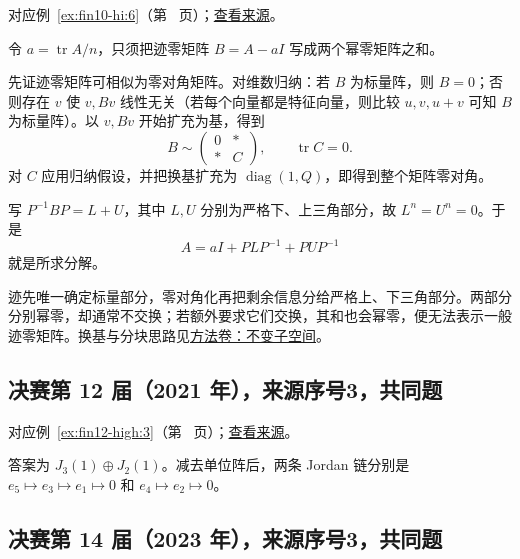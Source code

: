 \documentclass[12pt,fontset=fandol]{ctexart}
\begin{document}
对应例~\ref{ex:fin10-hi:6}（第~\pageref{ex:fin10-hi:6} 页）；\href{https://github.com/lzxcr/cmc-mathematics/blob/64916fa1fdbc3e444a652eca204d5669058ee321/src/problems/finals/10/06.md}{查看来源}。

\begin{solve}

令 $a=\operatorname{tr}A/n$，只须把迹零矩阵 $B=A-aI$ 写成两个幂零矩阵之和。

先证迹零矩阵可相似为零对角矩阵。对维数归纳：若 $B$ 为标量阵，则 $B=0$；否则存在 $v$ 使 $v,Bv$ 线性无关（若每个向量都是特征向量，则比较 $u,v,u+v$ 可知 $B$ 为标量阵）。以 $v,Bv$ 开始扩充为基，得到
\[
B\sim\begin{pmatrix}0&*\\ *&C\end{pmatrix},\qquad \operatorname{tr}C=0.
\]
对 $C$ 应用归纳假设，并把换基扩充为 $\operatorname{diag}(1,Q)$，即得到整个矩阵零对角。

写 $P^{-1}BP=L+U$，其中 $L,U$ 分别为严格下、上三角部分，故 $L^n=U^n=0$。于是
\[
A=aI+PLP^{-1}+PUP^{-1}
\]
就是所求分解。

\end{solve}

\begin{remark}[方法与条件]

迹先唯一确定标量部分，零对角化再把剩余信息分给严格上、下三角部分。两部分分别幂零，却通常不交换；若额外要求它们交换，其和也会幂零，便无法表示一般迹零矩阵。换基与分块思路见\hyperref[app:linear-invariant]{方法卷：不变子空间}。

\end{remark}

\subsection{决赛第 12 届（2021 年），来源序号3，共同题}\label{ans:fin12-high:3}\label{pr:fin12-high:3}

对应例~\ref{ex:fin12-high:3}（第~\pageref{ex:fin12-high:3} 页）；\href{https://github.com/lzxcr/cmc-mathematics/blob/64916fa1fdbc3e444a652eca204d5669058ee321/src/problems/finals/12/03.md}{查看来源}。

\begin{solve}

答案为 $J_3(1)\oplus J_2(1)$。减去单位阵后，两条 Jordan 链分别是 $e_5\mapsto e_3\mapsto e_1\mapsto0$ 和 $e_4\mapsto e_2\mapsto0$。

\end{solve}

\subsection{决赛第 14 届（2023 年），来源序号3，共同题}\label{ans:fin14-high:3}\label{pr:fin14-high:3}
\end{document}
